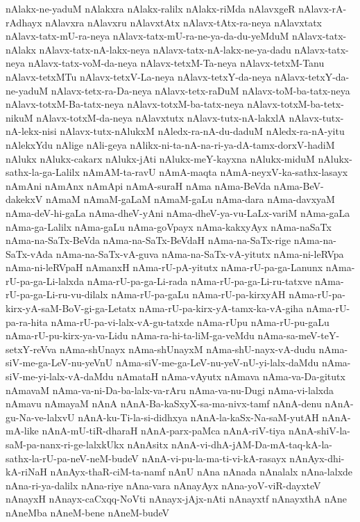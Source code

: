{nAlakx-ne-yaduM
nAlakxra
nAlakx-ralilx
nAlakx-riMda
nAlavxgeR
nAlavx-rA-rAdhayx
nAlavxra
nAlavxru
nAlavxtAtx
nAlavx-tAtx-ra-neya
nAlavxtatx
nAlavx-tatx-mU-ra-neya
nAlavx-tatx-mU-ra-ne-ya-da-du-yeMduM
nAlavx-tatx-nAlakx
nAlavx-tatx-nA-lakx-neya
nAlavx-tatx-nA-lakx-ne-ya-dadu
nAlavx-tatx-neya
nAlavx-tatx-voM-da-neya
nAlavx-tetxM-Ta-neya
nAlavx-tetxM-Tanu
nAlavx-tetxMTu
nAlavx-tetxV-La-neya
nAlavx-tetxY-da-neya
nAlavx-tetxY-da-ne-yaduM
nAlavx-tetx-ra-Da-neya
nAlavx-tetx-raDuM
nAlavx-toM-ba-tatx-neya
nAlavx-totxM-Ba-tatx-neya
nAlavx-totxM-ba-tatx-neya
nAlavx-totxM-ba-tetx-nikuM
nAlavx-totxM-da-neya
nAlavxtutx
nAlavx-tutx-nA-lakxlA
nAlavx-tutx-nA-lekx-nisi
nAlavx-tutx-nAlukxM
nAledx-ra-nA-du-daduM
nAledx-ra-nA-yitu
nAlekxYdu
nAlige
nAli-geya
nAlikx-ni-ta-nA-na-ri-ya-dA-tamx-dorxV-hadiM
nAlukx
nAlukx-cakarx
nAlukx-jAti
nAlukx-meY-kayxna
nAlukx-miduM
nAlukx-sathx-la-ga-Lalilx
nAmAM-ta-ravU
nAmA-maqta
nAmA-neyxV-ka-sathx-lasayx
nAmAni
nAmAnx
nAmApi
nAmA-suraH
nAma
nAma-BeVda
nAma-BeV-dakekxV
nAmaM
nAmaM-gaLaM
nAmaM-gaLu
nAma-dara
nAma-davxyaM
nAma-deV-hi-gaLa
nAma-dheV-yAni
nAma-dheV-ya-vu-LaLx-variM
nAma-gaLa
nAma-ga-Lalilx
nAma-gaLu
nAma-goVpayx
nAma-kakxyAyx
nAma-naSaTx
nAma-na-SaTx-BeVda
nAma-na-SaTx-BeVdaH
nAma-na-SaTx-rige
nAma-na-SaTx-vAda
nAma-na-SaTx-vA-guva
nAma-na-SaTx-vA-yitutx
nAma-ni-leRVpa
nAma-ni-leRVpaH
nAmanxH
nAma-rU-pA-yitutx
nAma-rU-pa-ga-Lanunx
nAma-rU-pa-ga-Li-lalxda
nAma-rU-pa-ga-Li-rada
nAma-rU-pa-ga-Li-ru-tatxve
nAma-rU-pa-ga-Li-ru-vu-dilalx
nAma-rU-pa-gaLu
nAma-rU-pa-kirxyAH
nAma-rU-pa-kirx-yA-saM-BoV-gi-ga-Letatx
nAma-rU-pa-kirx-yA-tamx-ka-vA-giha
nAma-rU-pa-ra-hita
nAma-rU-pa-vi-lalx-vA-gu-tatxde
nAma-rUpu
nAma-rU-pu-gaLu
nAma-rU-pu-kirx-ya-va-Lidu
nAma-ra-hi-ta-liM-ga-veMdu
nAma-sa-meV-teY-setxY-reVva
nAma-shUnayx
nAma-shUnayxM
nAma-shU-nayx-vA-dudu
nAma-siV-me-ga-LeV-nu-yeVnU
nAma-siV-me-ga-LeV-nu-yeV-nU-yi-lalx-daMdu
nAma-siV-me-yi-lalx-vA-daMdu
nAmataH
nAma-vAyutx
nAmava
nAma-va-Da-gitutx
nAmavaM
nAma-va-ni-Da-ba-lalx-va-rAru
nAma-va-nu-Dugi
nAma-vi-lalxda
nAmavu
nAmayaM
nAnA
nAnA-Ba-kaSxyX-sa-ma-nivx-tamf
nAnA-denu
nAnA-gu-Na-ve-lalxvU
nAnA-ku-Ti-la-si-didhxya
nAnA-la-kaSx-Na-saM-yutAH
nAnA-mA-like
nAnA-mU-tiR-dharaH
nAnA-parx-paMca
nAnA-riV-tiya
nAnA-shiV-la-saM-pa-nanx-ri-ge-lalxkUkx
nAnAsitx
nAnA-vi-dhA-jAM-Da-mA-taq-kA-la-sathx-la-rU-pa-neV-neM-budeV
nAnA-vi-pu-la-ma-ti-vi-kA-rasayx
nAnAyx-dhi-kA-riNaH
nAnAyx-thaR-ciM-ta-namf
nAnU
nAna
nAnada
nAnalalx
nAna-lalxde
nAna-ri-ya-dalilx
nAna-riye
nAna-vara
nAnayAyx
nAna-yoV-viR-dayxteV
nAnayxH
nAnayx-caCxqq-NoVti
nAnayx-jAjx-nAti
nAnayxtf
nAnayxthA
nAne
nAneMba
nAneM-bene
nAneM-budeV
}

